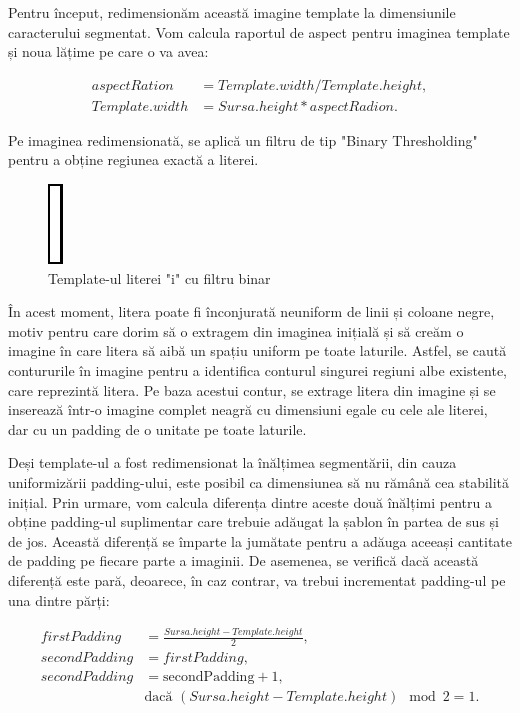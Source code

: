 \documentclass[a4paper,12pt]{report}
\begin{document}
Pentru început, redimensionăm această imagine template la dimensiunile caracterului segmentat. Vom calcula raportul de aspect pentru imaginea template și noua lățime pe care o va avea:

\[
    \begin{aligned}
        aspectRation   & = Template.width / Template.height, \\
        Template.width & = Sursa.height * aspectRadion.
    \end{aligned}
\]

Pe imaginea redimensionată, se aplică un filtru de tip "Binary Thresholding" pentru a obține regiunea exactă a literei.

\begin{figure}[h]
    \centering
    \includegraphics[height=0.2\textwidth]{images/binary_template.jpg}
    \caption{Template-ul literei "i" cu filtru binar}
\end{figure}
\FloatBarrier

În acest moment, litera poate fi înconjurată neuniform de linii și coloane negre, motiv pentru care dorim să o extragem din imaginea inițială și să creăm o imagine în care litera să aibă un spațiu uniform pe toate laturile. Astfel, se caută contururile în imagine pentru a identifica conturul singurei regiuni albe existente, care reprezintă litera. Pe baza acestui contur, se extrage litera din imagine și se inserează într-o imagine complet neagră cu dimensiuni egale cu cele ale literei, dar cu un padding de o unitate pe toate laturile.

Deși template-ul a fost redimensionat la înălțimea segmentării, din cauza uniformizării padding-ului, este posibil ca dimensiunea să nu rămână cea stabilită inițial. Prin urmare, vom calcula diferența dintre aceste două înălțimi pentru a obține padding-ul suplimentar care trebuie adăugat la șablon în partea de sus și de jos. Această diferență se împarte la jumătate pentru a adăuga aceeași cantitate de padding pe fiecare parte a imaginii. De asemenea, se verifică dacă această diferență este pară, deoarece, în caz contrar, va trebui incrementat padding-ul pe una dintre părți:

\[
    \begin{aligned}
        firstPadding  & = \frac{Sursa.height - Template.height}{2},               \\
        secondPadding & = firstPadding,                                           \\
        secondPadding & = \text{secondPadding} + 1,                               \\
                      & \text{dacă } (Sursa.height - Template.height) \mod 2 = 1.
    \end{aligned}
\]
\end{document}
